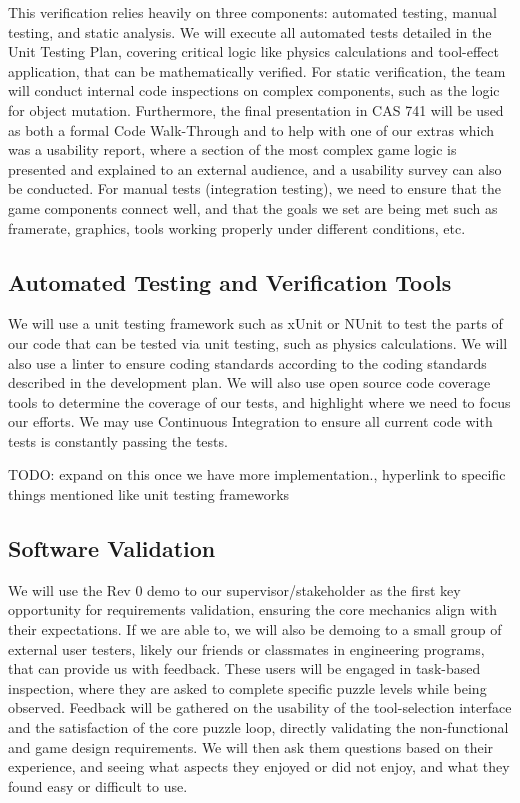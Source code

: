 \documentclass[12pt, titlepage]{article}
\begin{document}
This verification relies heavily on three components: automated testing, manual testing, and static analysis. We will execute all automated tests detailed in the Unit Testing Plan, covering critical logic like physics calculations and tool-effect application, that can be mathematically verified. For static verification, the team will conduct internal code inspections on complex components, such as the logic for object mutation. Furthermore, the final presentation in CAS 741 will be used as both a formal Code Walk-Through and to help with one of our extras which was a usability report, where a section of the most complex game logic is presented and explained to an external audience, and a usability survey can also be conducted. For manual tests (integration testing), we need to ensure that the game components connect well, and that the goals we set are being met such as framerate, graphics, tools working properly under different conditions, etc.

\subsection{Automated Testing and Verification Tools}

We will use a unit testing framework such as xUnit or NUnit to test the parts of our code that can be tested via unit testing, such as physics calculations. We will also use a linter to ensure coding standards according to the coding standards described in the development plan. We will also use open source code coverage tools to determine the coverage of our tests, and highlight where we need to focus our efforts. We may use Continuous Integration to ensure all current code with tests is constantly passing the tests.

TODO: expand on this once we have more implementation., hyperlink to specific things mentioned like unit testing frameworks

\subsection{Software Validation}

We will use the Rev 0 demo to our supervisor/stakeholder as the first key opportunity for requirements validation, ensuring the core mechanics align with their expectations. If we are able to, we will also be demoing to a small group of external user testers, likely our friends or classmates in engineering programs, that can provide us with feedback. These users will be engaged in task-based inspection, where they are asked to complete specific puzzle levels while being observed. Feedback will be gathered on the usability of the tool-selection interface and the satisfaction of the core puzzle loop, directly validating the non-functional and game design requirements. We will then ask them questions based on their experience, and seeing what aspects they enjoyed or did not enjoy, and what they found easy or difficult to use.
\end{document}
